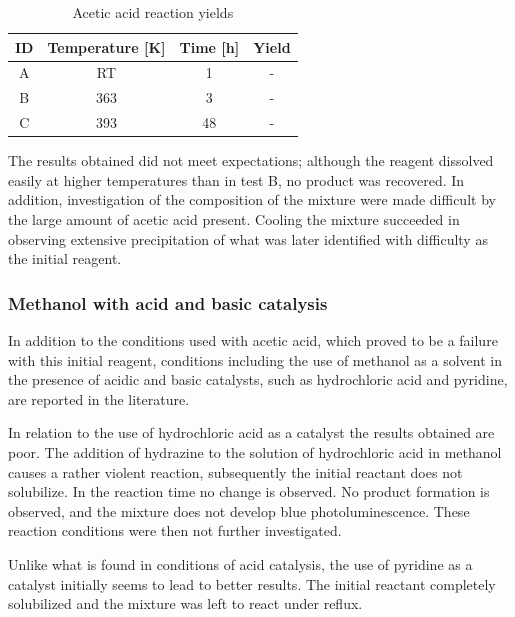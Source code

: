 \documentclass[../Master.tex]{subfiles}
\begin{document}
\begin{table}[h!]
	\centering
	\begin{tabular}[b]{cccc}
		\toprule
		ID & Temperature [K] & Time [h] & Yield \\
		\midrule
		A  & RT              & 1        & -     \\
		B  & 363             & 3        & -     \\
		C  & 393             & 48       & -     \\
		\bottomrule
	\end{tabular}
	\caption{Acetic acid reaction yields}\label{tab:hydrazine-ratio}
\end{table}

The results obtained did not meet expectations; although the reagent dissolved easily at higher temperatures than in test B, no product was recovered.
In addition, investigation of the composition of the mixture were made difficult by the large amount of acetic acid present. Cooling the mixture succeeded in observing extensive precipitation of what was later identified with difficulty as the initial reagent.

\subsubsection{Methanol with acid and basic catalysis}\label{sec:et-ac-bas}

In addition to the conditions used with acetic acid, which proved to be a failure with this initial reagent, conditions including the use of methanol as a solvent in the presence of acidic and basic catalysts, such as hydrochloric acid and pyridine, are reported in the literature.

In relation to the use of hydrochloric acid as a catalyst the results obtained are poor. The addition of hydrazine to the solution of hydrochloric acid in methanol causes a rather violent reaction, subsequently the initial reactant does not solubilize. In the reaction time no change is observed. No product formation is observed, and the mixture does not develop blue photoluminescence. These reaction conditions were then not further investigated.

Unlike what is found in conditions of acid catalysis, the use of pyridine as a catalyst initially seems to lead to better results.
The initial reactant completely solubilized and the mixture was left to react under reflux.

\end{document}
